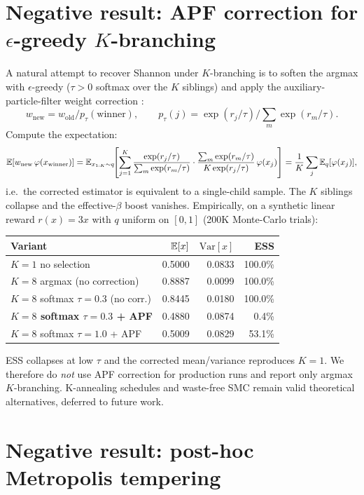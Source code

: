 \section{Negative result: APF correction for $\epsilon$-greedy $K$-branching}\label{app:apf}

A natural attempt to recover Shannon under $K$-branching is to soften the argmax with $\epsilon$-greedy ($\tau\!>\!0$ softmax over the $K$ siblings) and apply the auxiliary-particle-filter weight correction \citep{pittshephard1999}:
\[
w_{\mathrm{new}} = w_{\mathrm{old}}\big/p_\tau(\mathrm{winner}),\qquad p_\tau(j)=\exp(r_j/\tau)\big/\sum_m\exp(r_m/\tau).
\]
Compute the expectation:
\[
\mathbb{E}[w_{\mathrm{new}}\,\varphi(x_{\mathrm{winner}})] = \mathbb{E}_{x_{1:K}\sim q}\!\!\left[\sum_{j=1}^K \frac{\exp(r_j/\tau)}{\sum_m\exp(r_m/\tau)}\cdot\frac{\sum_m\exp(r_m/\tau)}{K\exp(r_j/\tau)}\,\varphi(x_j)\right]=\frac{1}{K}\sum_j \mathbb{E}_q[\varphi(x_j)],
\]
i.e.\ the corrected estimator is equivalent to a single-child sample. The $K$ siblings collapse and the effective-$\beta$ boost vanishes. Empirically, on a synthetic linear reward $r(x)\!=\!3x$ with $q$ uniform on $[0,1]$ (200K Monte-Carlo trials):
\begin{center}
\small
\begin{tabular}{lrrr}
\toprule
Variant & $\mathbb{E}[x]$ & $\mathrm{Var}[x]$ & ESS \\
\midrule
$K=1$ no selection                & 0.5000 & 0.0833 & 100.0\% \\
$K=8$ argmax (no correction)      & 0.8887 & 0.0099 & 100.0\% \\
$K=8$ softmax $\tau\!=\!0.3$ (no corr.) & 0.8445 & 0.0180 & 100.0\% \\
\textbf{$K=8$ softmax $\tau\!=\!0.3$ + APF} & 0.4880 & 0.0874 & 0.4\% \\
$K=8$ softmax $\tau\!=\!1.0$ + APF & 0.5009 & 0.0829 & 53.1\% \\
\bottomrule
\end{tabular}
\end{center}
ESS collapses at low $\tau$ and the corrected mean/variance reproduces $K=1$. We therefore do \emph{not} use APF correction for production runs and report only argmax $K$-branching. K-annealing schedules and waste-free SMC \citep{dau2022wastefree} remain valid theoretical alternatives, deferred to future work.

\section{Negative result: post-hoc Metropolis tempering}\label{app:posthoc}

